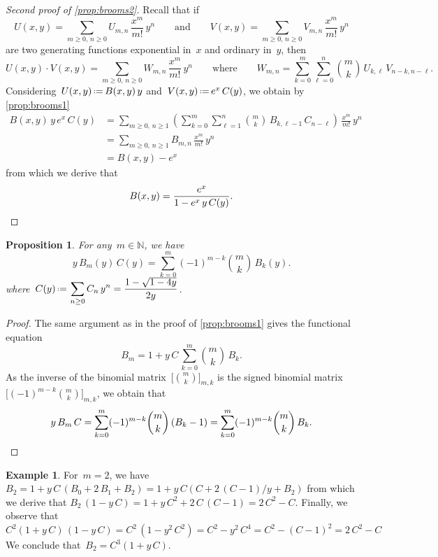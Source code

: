 \documentclass{amsart}
\newtheorem{proposition}[theorem]{Proposition}
\theoremstyle{definition}
\newtheorem{example}[theorem]{Example}
\newcommand{\N}{\mathbb{N}} %
\newcommand{\eqdef}{\mbox{\,\raisebox{0.2ex}{\scriptsize\ensuremath{\mathrm:}}\ensuremath{=}\,}} %
\begin{document}
\begin{proof}[Second proof of \cref{prop:brooms2}]
Recall that if
\[
U(x,y) = \sum_{m \ge 0, \, n \ge 0} U_{m,n} \, \frac{x^m}{m!} \, y^n
\qquad\text{and}\qquad
V(x,y) = \sum_{m \ge 0, \, n \ge 0} V_{m,n} \, \frac{x^m}{m!} \, y^n
\]
are two generating functions exponential in~$x$ and ordinary in~$y$, then
\[
U(x,y) \cdot V(x,y) = \sum_{m \ge 0, \, n \ge 0} W_{m,n}  \, \frac{x^m}{m!} \, y^n
\qquad\text{where}\qquad
W_{m,n} = \sum_{k = 0}^m \sum_{\ell = 0}^n \binom{m}{k} \, U_{k,\ell} \, V_{n-k,n-\ell}.
\]
Considering~$U(x,y) \eqdef B(x,y) \, y$ and~$V(x,y) \eqdef e^x \, C(y)$, we obtain by \cref{prop:brooms1}
\begin{align*}
B(x,y) \, y \, e^x \, C(y) & = \sum_{m \ge 0, \, n \ge 1}  \left( \sum_{k = 0}^m \sum_{\ell = 1}^n \binom{m}{k} \, B_{k,\ell-1} \, C_{n-\ell} \right) \, \frac{x^m}{m!} \, y^n \\
& = \sum_{m \ge 0, \, n \ge 1} B_{m,n} \, \frac{x^m}{m!} \, y^n \\
& = B(x,y) - e^x
\end{align*}
from which we derive that
\[
B(x,y) = \frac{e^x}{1-e^x \, y \, C(y)}.
\qedhere
\]
\end{proof}

\begin{proposition}
\label{prop:brooms3}
For any~$m \in \N$, we have
\[
y \, B_m(y) \, C(y) = \sum_{k = 0}^m (-1)^{m-k} \binom{m}{k} \, B_k(y).
\]
where~$\displaystyle C(y) \eqdef \sum_{n \ge 0} C_n \, y^n = \frac{1-\sqrt{1-4y}}{2y}$.
\end{proposition}

\begin{proof}
The same argument as in the proof of \cref{prop:brooms1} gives the functional equation
\[
B_m = 1 + y \, C \, \sum_{k = 0}^m \binom{m}{k} \, B_k.
\]
As the inverse of the binomial matrix~$\big[\binom{m}{k}\big]_{m,k}$ is the signed binomial matrix~$\big[(-1)^{m-k}\binom{m}{k}\big]_{m,k}$, we obtain that
\[
y \, B_m \, C = \sum_{k = 0}^m (-1)^{m-k} \binom{m}{k} \,(B_k - 1) = \sum_{k = 0}^m (-1)^{m-k} \binom{m}{k} \, B_k.
\qedhere
\]
\end{proof}

\begin{example}
For~$m = 2$, we have
\(
B_2 = 1 + y \, C \, (B_0 + 2  \, B_1 + B_2) = 1 + y \, C( C + 2 \, (C - 1) / y + B_2)
\)
from which we derive that
\(
B_2 \, (1 - y \, C) = 1 + y \, C^2 + 2 \, C \, (C - 1) = 2 \, C^2 - C. 
\)
Finally, we observe that
\(
C^2 (1+y \, C) \, ( 1 - y \, C) = C^2 \, (1 - y^2 \, C^2) = C^2 - y^2 \, C^4 = C^2 - (C - 1)^2 = 2 \, C^2 - C
\)
We conclude that~$B_2 = C^3 (1+y \, C)$.
\end{example}
\end{document}
